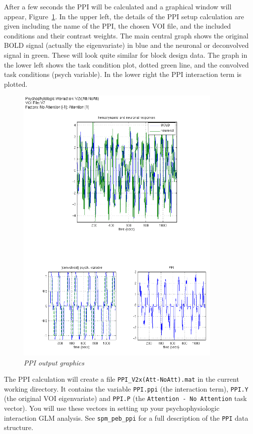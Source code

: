 After a few seconds the PPI will be calculated and a graphical window will appear, Figure~\ref{fig:ppi13}. In the upper left, the details of the PPI setup calculation are given including the name of the PPI, the chosen VOI file, and the included conditions and their contrast weights. The main central graph shows the original BOLD signal (actually the eigenvariate) in blue and the neuronal or deconvolved signal in green. These will look quite similar for block design data. The graph in the lower left shows the task condition plot, dotted green line, and the convolved task conditions (psych variable). In the lower right the PPI interaction term is plotted.

\begin{figure}[!ht]
\centering\includegraphics[width=100mm]{ppi/figures/Fig13.png}
\caption{\em PPI output graphics}
\label{fig:ppi13}
\end{figure}

The PPI calculation will create a file \texttt{PPI\_V2x(Att-NoAtt).mat} in the current working directory. It contains the variable \texttt{PPI.ppi} (the interaction term), \texttt{PPI.Y} (the original VOI eigenvariate) and \texttt{PPI.P} (the \texttt{Attention - No Attention} task vector). You will use these vectors in setting up your psychophysiologic interaction GLM analysis. See \texttt{spm\_peb\_ppi} for a full description of the \texttt{PPI} data structure. 

